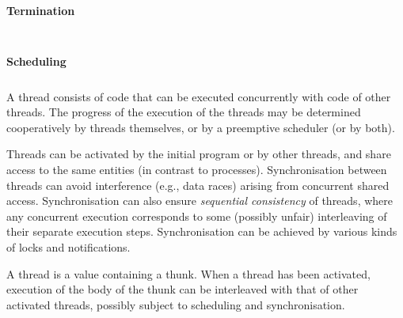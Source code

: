 \paragraph*{Termination}\hypertarget{termination}{}\label{termination}

\begin{align*}
  [ ~ 
  \KEY{Funcon} ~ & \NAMEREF{thread-terminate} \\
  \KEY{Funcon} ~ & \NAMEREF{is-thread-terminated} \\
  \KEY{Funcon} ~ & \NAMEREF{thread-value} \\
  \KEY{Funcon} ~ & \NAMEREF{thread-join} \\
  \KEY{Funcon} ~ & \NAMEREF{thread-exterminate}
  ~ ]
\end{align*}
\paragraph*{Scheduling}\hypertarget{scheduling}{}\label{scheduling}

\begin{align*}
  [ ~ 
  \KEY{Funcon} ~ & \NAMEREF{update-thread-stepping} \\
  \KEY{Funcon} ~ & \NAMEREF{update-thread-schedule} \\
  \KEY{Funcon} ~ & \NAMEREF{current-thread-schedule} \\
  \KEY{Funcon} ~ & \NAMEREF{is-thread-preemptible} \\
  \KEY{Funcon} ~ & \NAMEREF{thread-preemptible} \\
  \KEY{Funcon} ~ & \NAMEREF{thread-cooperative}
  ~ ]
\end{align*}
A thread consists of code that can be executed concurrently with code
of other threads. The progress of the execution of the threads may be
determined cooperatively by threads themselves, or by a preemptive
scheduler (or by both).

Threads can be activated by the initial program or by other threads, 
and share access to the same entities (in contrast to processes). 
Synchronisation between threads can avoid interference (e.g., data
races) arising from concurrent shared access. Synchronisation can also
ensure \emph{sequential consistency} of threads, where any concurrent
execution corresponds to some (possibly unfair) interleaving of their
separate execution steps. Synchronisation can be achieved by various
kinds of locks and notifications.

A thread is a value containing a thunk. When a thread has been activated,
execution of the body of the thunk can be interleaved with that of other
activated threads, possibly subject to scheduling and synchronisation.

